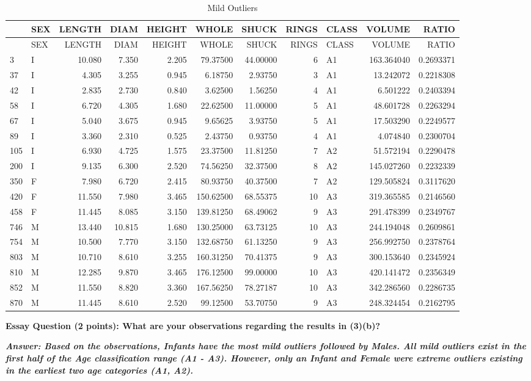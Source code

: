 \documentclass[
]{article}
\begin{document}
\begin{longtable}[]{@{}llrrrrrrlrr@{}}
\caption{Mild Outliers}\tabularnewline
\toprule
& SEX & LENGTH & DIAM & HEIGHT & WHOLE & SHUCK & RINGS & CLASS & VOLUME
& RATIO\tabularnewline
\midrule
\endfirsthead
\toprule
& SEX & LENGTH & DIAM & HEIGHT & WHOLE & SHUCK & RINGS & CLASS & VOLUME
& RATIO\tabularnewline
\midrule
\endhead
3 & I & 10.080 & 7.350 & 2.205 & 79.37500 & 44.00000 & 6 & A1 &
163.364040 & 0.2693371\tabularnewline
37 & I & 4.305 & 3.255 & 0.945 & 6.18750 & 2.93750 & 3 & A1 & 13.242072
& 0.2218308\tabularnewline
42 & I & 2.835 & 2.730 & 0.840 & 3.62500 & 1.56250 & 4 & A1 & 6.501222 &
0.2403394\tabularnewline
58 & I & 6.720 & 4.305 & 1.680 & 22.62500 & 11.00000 & 5 & A1 &
48.601728 & 0.2263294\tabularnewline
67 & I & 5.040 & 3.675 & 0.945 & 9.65625 & 3.93750 & 5 & A1 & 17.503290
& 0.2249577\tabularnewline
89 & I & 3.360 & 2.310 & 0.525 & 2.43750 & 0.93750 & 4 & A1 & 4.074840 &
0.2300704\tabularnewline
105 & I & 6.930 & 4.725 & 1.575 & 23.37500 & 11.81250 & 7 & A2 &
51.572194 & 0.2290478\tabularnewline
200 & I & 9.135 & 6.300 & 2.520 & 74.56250 & 32.37500 & 8 & A2 &
145.027260 & 0.2232339\tabularnewline
350 & F & 7.980 & 6.720 & 2.415 & 80.93750 & 40.37500 & 7 & A2 &
129.505824 & 0.3117620\tabularnewline
420 & F & 11.550 & 7.980 & 3.465 & 150.62500 & 68.55375 & 10 & A3 &
319.365585 & 0.2146560\tabularnewline
458 & F & 11.445 & 8.085 & 3.150 & 139.81250 & 68.49062 & 9 & A3 &
291.478399 & 0.2349767\tabularnewline
746 & M & 13.440 & 10.815 & 1.680 & 130.25000 & 63.73125 & 10 & A3 &
244.194048 & 0.2609861\tabularnewline
754 & M & 10.500 & 7.770 & 3.150 & 132.68750 & 61.13250 & 9 & A3 &
256.992750 & 0.2378764\tabularnewline
803 & M & 10.710 & 8.610 & 3.255 & 160.31250 & 70.41375 & 9 & A3 &
300.153640 & 0.2345924\tabularnewline
810 & M & 12.285 & 9.870 & 3.465 & 176.12500 & 99.00000 & 10 & A3 &
420.141472 & 0.2356349\tabularnewline
852 & M & 11.550 & 8.820 & 3.360 & 167.56250 & 78.27187 & 10 & A3 &
342.286560 & 0.2286735\tabularnewline
870 & M & 11.445 & 8.610 & 2.520 & 99.12500 & 53.70750 & 9 & A3 &
248.324454 & 0.2162795\tabularnewline
\bottomrule
\end{longtable}

\textbf{Essay Question (2 points): What are your observations regarding
the results in (3)(b)?}

\textbf{\emph{Answer: Based on the observations, Infants have the most
mild outliers followed by Males. All mild outliers exist in the first
half of the Age classification range (A1 - A3). However, only an Infant
and Female were extreme outliers existing in the earliest two age
categories (A1, A2). }}
\end{document}
